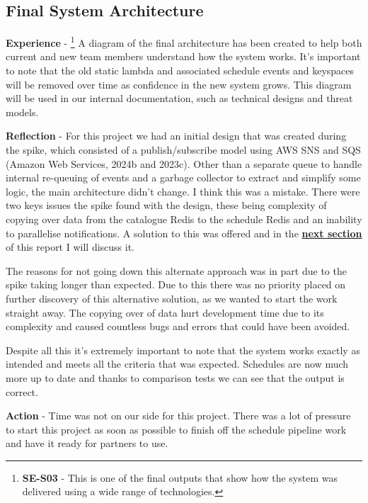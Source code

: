   \newpage
  \subsection{Final System Architecture}

  \textbf{Experience} - 
  \footnote{\textbf{SE-S03} - This is one of the final outputs that show how the system was delivered using a wide range of technologies.}
  A diagram of the final architecture has been created to help both current and new team members understand how the system works.
  It's important to note that the old static lambda and associated schedule events and keyspaces will be removed over time as confidence in the new system 
  grows. This diagram will be used in our internal documentation, such as technical designs and threat models.

  \vspace{0.2cm}
  \textbf{Reflection} - For this project we had an initial design that was created during the spike, which consisted of a publish/subscribe model using
  AWS SNS and SQS (Amazon Web Services, 2024b and 2023c). Other than a separate queue to handle internal re-queuing of events and a garbage collector to 
  extract and simplify some logic, the main architecture didn't change. I think this was a mistake. There were two keys issues the spike found with the design,
  these being complexity of copying over data from the catalogue Redis to the schedule Redis and an inability to parallelise notifications. A solution to this 
  was offered and in the \hyperref[sec:dynamo]{\textbf{next section}} of this report I will discuss it. 

  The reasons for not going down this alternate approach was in part due to the spike taking longer than expected. Due to this there was no priority placed 
  on further discovery of this alternative solution, as we wanted to start the work straight away. The copying over of data hurt development time due to 
  its complexity and caused countless bugs and errors that could have been avoided.

  Despite all this it's extremely important to note that the system works exactly as intended and meets all the criteria that was expected. Schedules are 
  now much more up to date and thanks to comparison tests we can see that the output is correct.

  \vspace{0.2cm}
  \textbf{Action} - Time was not on our side for this project. There was a lot of pressure to start this project as soon as possible to finish off the 
  schedule pipeline work and have it ready for partners to use.

